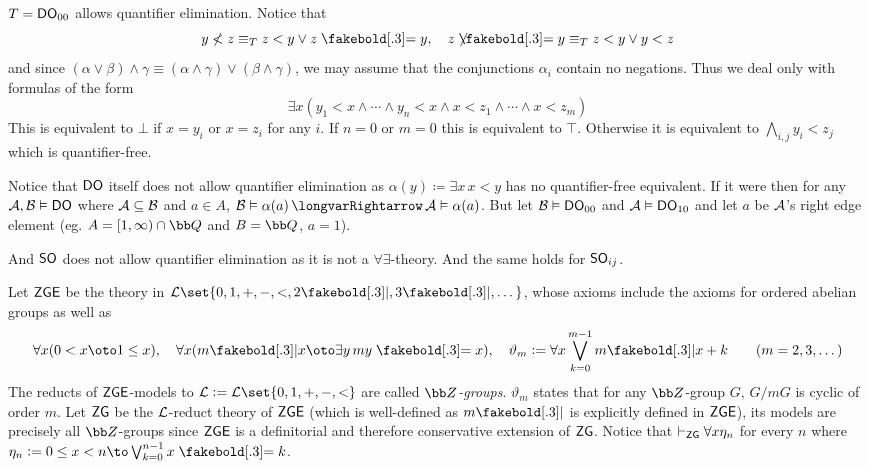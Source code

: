 \ethrm

\bexam

    $T={\sf DO}_{00}$ allows quantifier elimination.
    Notice that
    $$ y\nless z\equiv_T z<y\lor z\eq y,\quad z\neqb y\equiv_T z<y\lor y<z $$
    and since $(\alpha\lor\beta)\land\gamma\equiv(\alpha\land\gamma)\lor(\beta\land\gamma)$, we may assume that the conjunctions $\alpha_i$ contain no negations.
    Thus we deal only with formulas of the form
    $$ \exists x(y_1<x\land\cdots\land y_n<x\land x<z_1\land\cdots\land x<z_m) $$
    This is equivalent to $\bot$ if $x=y_i$ or $x=z_i$ for any $i$.
    If $n=0$ or $m=0$ this is equivalent to $\top$.
    Otherwise it is equivalent to $\bigwedge_{i,j}y_i<z_j$ which is quantifier-free.

\eexam

Notice that ${\sf DO}$ itself does not allow quantifier elimination as $\alpha(y)\coloneqq\exists x\,x<y$ has no quantifier-free equivalent.
If it were then for any ${\cal A},{\cal B}\vDash{\sf DO}$ where ${\cal A}\subseteq{\cal B}$ and $a\in A$, ${\cal B}\vDash\alpha(a)\implies{\cal A}\vDash\alpha(a)$.
But let ${\cal B}\vDash{\sf DO}_{00}$ and ${\cal A}\vDash{\sf DO}_{10}$ and let $a$ be ${\cal A}$'s right edge element (eg. $A=[1,\infty)\cap{\bb Q}$ and $B={\bb Q}$, $a=1$).

And ${\sf SO}$ does not allow quantifier elimination as it is not a $\forall\exists$-theory.
And the same holds for ${\sf SO}_{ij}$.

\bexam

    Let ${\sf ZGE}$ be the theory in ${\cal L}\set{0,1,+,-,<,2\bdivs,3\bdivs,\dots}$, whose axioms include the axioms for ordered abelian groups as well as
    $$ \forall x(0<x\oto 1\leq x),\quad\forall x(m\bdivs x\oto\exists y\,my\eq x),\quad \vartheta_m\coloneqq\forall x\bigvee_{k=0}^{m-1}m\bdivs x+k \qquad (m=2,3,\dots) $$
    The reducts of ${\sf ZGE}$-models to ${\cal L}\coloneqq{\cal L}\set{0,1,+,-,<}$ are called {\it ${\bb Z}$-groups}.
    $\vartheta_m$ states that for any ${\bb Z}$-group $G$, $G/mG$ is cyclic of order $m$.
    Let ${\sf ZG}$ be the ${\cal L}$-reduct theory of ${\sf ZGE}$ (which is well-defined as $m\bdivs$ is explicitly defined in ${\sf ZGE}$), its models are precisely all ${\bb Z}$-groups since ${\sf ZGE}$
    is a definitorial and therefore conservative extension of ${\sf ZG}$.
    Notice that $\vdash_{\sf ZG}\forall x\eta_n$ for every $n$ where $\eta_n\coloneqq 0\leq x<n\to\bigvee_{k=0}^{n-1}x\eq k$.

